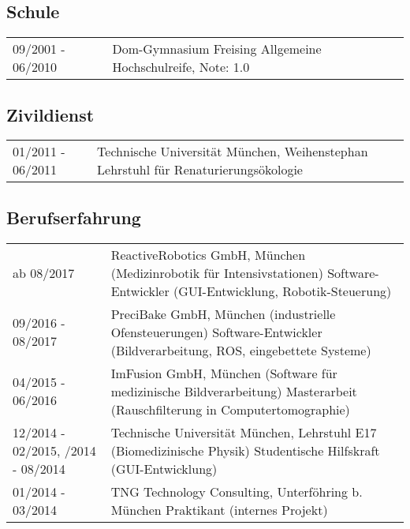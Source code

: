 \documentclass[a4paper,10pt]{memoir}
\begin{document}
\subsection*{Schule}
\vspace*{-\baselineskip}
\begin{longtable}{@{}p{} p{}}
  09/2001 - 06/2010 &
  Dom-Gymnasium Freising  \newline
  Allgemeine Hochschulreife, Note: 1.0
\end{longtable}

\subsection*{Zivildienst}
\vspace*{-\baselineskip}
\begin{longtable}{@{}p{} p{}}
  01/2011 - 06/2011 &
  Technische Universität München, Weihenstephan \newline
  Lehrstuhl für Renaturierungsökologie
\end{longtable}

\subsection*{Berufserfahrung}
\vspace*{-\baselineskip}
\begin{longtable}{@{}p{} p{}}
  ab 08/2017 &
  ReactiveRobotics GmbH, München (Medizinrobotik für Intensivstationen) \newline
  Software-Entwickler (GUI-Entwicklung, Robotik-Steuerung)
  \\
  09/2016 - 08/2017 &
  PreciBake GmbH, München (industrielle Ofensteuerungen) \newline
  Software-Entwickler (Bildverarbeitung, ROS, eingebettete Systeme)
  \\
  04/2015 - 06/2016 &
  ImFusion GmbH, München (Software für medizinische Bildverarbeitung) \newline
  Masterarbeit (Rauschfilterung in Computertomographie)
  \\
  12/2014 - 02/2015, \newline
  06/2014 - 08/2014 &
  Technische Universität München, Lehrstuhl E17 (Biomedizinische Physik) \newline
  Studentische Hilfskraft (GUI-Entwicklung)
  \\
  01/2014 - 03/2014 &
  TNG Technology Consulting, Unterföhring b. München \newline
  Praktikant (internes Projekt)
\end{longtable}
\end{document}
